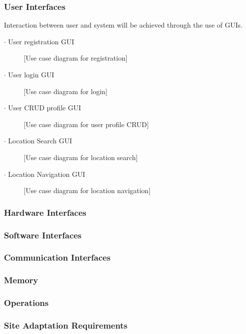 \documentclass{article}
\begin{document}
        \subsubsection{User Interfaces}
            Interaction between user and system will be achieved through the use of GUIs.
            \begin{description}
            \item[$\cdot$ User registration GUI] [Use case diagram for registration]
            
            \item[$\cdot$ User login GUI ][Use case diagram for login]
            
            \item[$\cdot$ User CRUD profile GUI] [Use case diagram for user profile CRUD]
            
            \item[$\cdot$ Location Search GUI] [Use case diagram for location search]
            
            \item[$\cdot$ Location Navigation GUI] [Use case diagram for location navigation]
            \end{description}
            
        \subsubsection{Hardware Interfaces}
        \subsubsection{Software Interfaces}
        \subsubsection{Communication Interfaces}
        \subsubsection{Memory}
        \subsubsection{Operations}
        \subsubsection{Site Adaptation Requirements}
\end{document}
